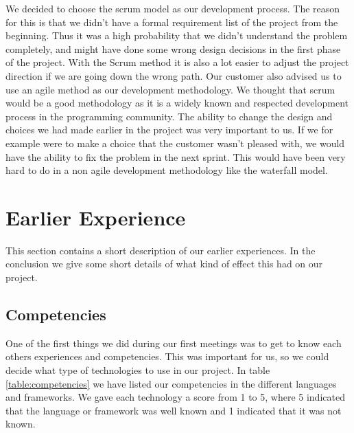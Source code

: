 We decided to choose the scrum model as our development process. 
The reason for this is that we didn't have a formal requirement list of the project from the beginning.
Thus it was a high probability that we didn't understand the problem completely, and might have done some wrong design decisions in the first phase of the project. 
With the Scrum method it is also a lot easier to adjust the project direction if we are going down the wrong path.
Our customer also advised us to use an agile method as our development methodology.
We thought that scrum would be a good methodology as it is a widely known and respected development process in the programming community.
The ability to change the design and choices we had made earlier in the project was very important to us.
If we for example were to make a choice that the customer wasn't pleased with, we would have the ability to fix the problem in the next sprint.
This would have been very hard to do in a non agile development methodology like the waterfall model.


\section{Earlier Experience}
\label{section:earlier-experience}

This section contains a short description of our earlier experiences.
In the conclusion we give some short details of what kind of effect this had on our project.

\subsection{Competencies}

One of the first things we did during our first meetings was to get to know each others experiences and competencies.
This was important for us, so we could decide what type of technologies to use in our project.
In table \ref{table:competencies} we have listed our competencies in the different languages and frameworks.
We gave each technology a score from 1 to 5, where 5 indicated that the language or framework was well known and 1 indicated that it was not known.

